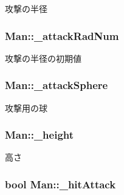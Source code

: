 攻撃の半径 

\hypertarget{class_man_a3479373b377a9d008410d94e16112897}{
\subsubsection[{\-\_\-attack\-Rad\-Num}]{ Man\-::\-\_\-attack\-Rad\-Num\hspace{0.3cm}{\ttfamily [protected]}}}\label{class_man_a3479373b377a9d008410d94e16112897}


攻撃の半径の初期値 

\hypertarget{class_man_a904eaf8909829ca908e6c2fad0e4f0b1}{
\subsubsection[{\-\_\-attack\-Sphere}]{ Man\-::\-\_\-attack\-Sphere\hspace{0.3cm}{\ttfamily [protected]}}}\label{class_man_a904eaf8909829ca908e6c2fad0e4f0b1}


攻撃用の球 

\hypertarget{class_man_a2bf56500306d81e049788a83604cd723}{
\subsubsection[{\-\_\-height}]{ Man\-::\-\_\-height\hspace{0.3cm}{\ttfamily [protected]}}}\label{class_man_a2bf56500306d81e049788a83604cd723}


高さ 

\hypertarget{class_man_a5021ebc7e4ff19d3620f51ccc22d9c6b}{
\subsubsection[{\-\_\-hit\-Attack}]{\setlength{\rightskip}{0pt plus 5cm}bool Man\-::\-\_\-hit\-Attack\hspace{0.3cm}{\ttfamily [protected]}}}\label{class_man_a5021ebc7e4ff19d3620f51ccc22d9c6b}


